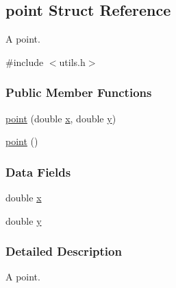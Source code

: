 \hypertarget{structpoint}{\subsection{point \-Struct \-Reference}
\label{structpoint}
}


\-A point.  




{\ttfamily \#include $<$utils.\-h$>$}

\subsubsection*{\-Public \-Member \-Functions}
\begin{DoxyCompactItemize}
\item 
\hyperlink{structpoint_abe722dd304b3c2db9883f8dac82bdb15}{point} (double \hyperlink{structpoint_a9c6b34deaf4900ad4193c17935fd384a}{x}, double \hyperlink{structpoint_a613f8f0d7352731638b0094e1b958b87}{y})
\item 
\hyperlink{structpoint_a5fe21d4a4539320bf0f5caf1218d31c8}{point} ()
\end{DoxyCompactItemize}
\subsubsection*{\-Data \-Fields}
\begin{DoxyCompactItemize}
\item 
double \hyperlink{structpoint_a9c6b34deaf4900ad4193c17935fd384a}{x}
\item 
double \hyperlink{structpoint_a613f8f0d7352731638b0094e1b958b87}{y}
\end{DoxyCompactItemize}


\subsubsection{\-Detailed \-Description}
\-A point. 

